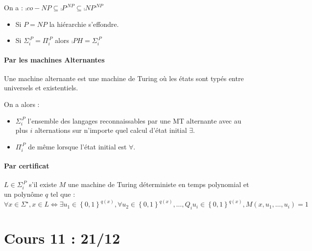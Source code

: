 \documentclass{cours}
\begin{document}
\begin{proposition}
    On a : $\comp{co-NP} \subseteq \comp{P}^{\comp{NP}} \subseteq \comp{NP}^{\comp{NP}}$
    \begin{itemize}
        \item Si $P = NP$ la hiérarchie s'effondre.
        \item Si $\Sigma_{i}^{\comp{P}} = \Pi_{i}^{\comp{P}}$ alors $\comp{PH} = \Sigma_{i}^{\comp{P}}$
    \end{itemize}
\end{proposition}

\subsection{Par les machines Alternantes}
\begin{definition}
    Une machine alternante est une machine de Turing où les états sont typés entre universels et existentiels.
\end{definition}

\begin{proposition}
    On a alors : 
    \begin{itemize}
        \item $\Sigma_{i}^{\comp{P}}$ l'ensemble des langages reconnaissables par une MT alternante avec au plus $i$ alternations sur n'importe quel calcul d'état initial $\exists$.
        \item $\Pi_{i}^{\comp{P}}$ de même lorsque l'état initial est $\forall$.
    \end{itemize}
\end{proposition}

\subsection{Par certificat}
\begin{proposition}
    $L \in \Sigma_{i}^{\comp{P}}$ s'il existe $M$ une machine de Turing déterministe en temps polynomial et un polynôme $q$ tel que : 
    \[
        \forall x \in \Sigma^{\star}, x \in L \Leftrightarrow \exists u_{1} \in \left\{0, 1\right\}^{q(x)}, \forall u_{2} \in \left\{0, 1\right\}^{q(x)}, \ldots, Q_{i}u_{i} \in \left\{0, 1\right\}^{q(x)}, M(x, u_{1}, \ldots, u_{i}) = 1
    \]
\end{proposition}

\part[Classes en Espace]{Cours 11 : 21/12}
\end{document}
